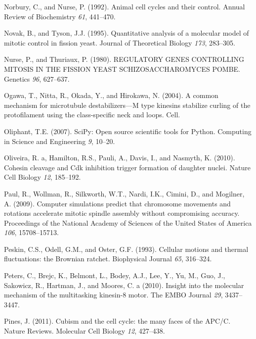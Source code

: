 \documentclass[12pt,a4paper,twoside,openright]{book}
\begin{document}
Norbury, C., and Nurse, P. (1992). Animal cell cycles and their control.
Annual Review of Biochemistry \emph{61}, 441--470.

Novak, B., and Tyson, J.J. (1995). Quantitative analysis of a molecular
model of mitotic control in fission yeast. Journal of Theoretical
Biology \emph{173}, 283--305.

Nurse, P., and Thuriaux, P. (1980). REGULATORY GENES CONTROLLING MITOSIS
IN THE FISSION YEAST SCHIZOSACCHAROMYCES POMBE. Genetics \emph{96},
627--637.

Ogawa, T., Nitta, R., Okada, Y., and Hirokawa, N. (2004). A common
mechanism for microtubule destabilizers---M type kinesins stabilize
curling of the protofilament using the class-specific neck and loops.
Cell.

Oliphant, T.E. (2007). SciPy: Open source scientific tools for Python.
Computing in Science and Engineering \emph{9}, 10--20.

Oliveira, R. a, Hamilton, R.S., Pauli, A., Davis, I., and Nasmyth, K.
(2010). Cohesin cleavage and Cdk inhibition trigger formation of
daughter nuclei. Nature Cell Biology \emph{12}, 185--192.

Paul, R., Wollman, R., Silkworth, W.T., Nardi, I.K., Cimini, D., and
Mogilner, A. (2009). Computer simulations predict that chromosome
movements and rotations accelerate mitotic spindle assembly without
compromising accuracy. Proceedings of the National Academy of Sciences
of the United States of America \emph{106}, 15708--15713.

Peskin, C.S., Odell, G.M., and Oster, G.F. (1993). Cellular motions and
thermal fluctuations: the Brownian ratchet. Biophysical Journal
\emph{65}, 316--324.

Peters, C., Brejc, K., Belmont, L., Bodey, A.J., Lee, Y., Yu, M., Guo,
J., Sakowicz, R., Hartman, J., and Moores, C. a (2010). Insight into the
molecular mechanism of the multitasking kinesin-8 motor. The EMBO
Journal \emph{29}, 3437--3447.

Pines, J. (2011). Cubism and the cell cycle: the many faces of the
APC/C. Nature Reviews. Molecular Cell Biology \emph{12}, 427--438.
\end{document}
